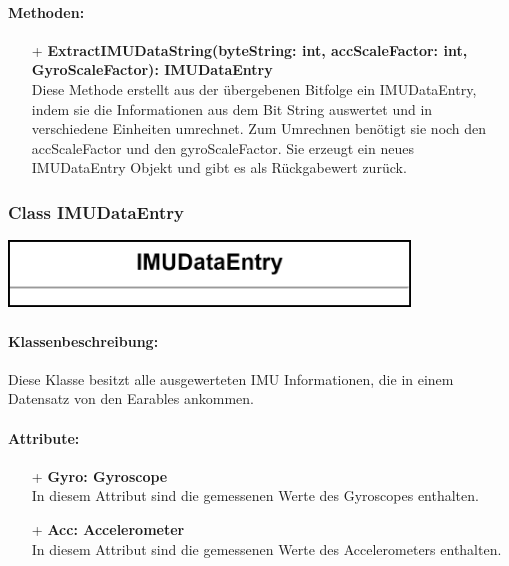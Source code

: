\documentclass[a4paper,12pt]{article}
\begin{document}
\paragraph{Methoden:}
\begin{itemize}
	\item[+] \textbf{ExtractIMUDataString(byteString: int, accScaleFactor: int, GyroScaleFactor): IMUDataEntry}\\Diese Methode erstellt aus der übergebenen Bitfolge ein IMUDataEntry, indem sie die Informationen aus dem Bit String auswertet und in verschiedene Einheiten umrechnet. Zum Umrechnen benötigt sie noch den accScaleFactor und den gyroScaleFactor. Sie erzeugt ein neues IMUDataEntry Objekt und gibt es als Rückgabewert zurück.
\end{itemize}


\begin{minipage}[b]{0.5\textwidth}
	\subsubsection{Class IMUDataEntry}
	
	\end{minipage}
	\begin{minipage}[c]{0.5\textwidth}
	\includegraphics[width=0.8\textwidth]{bilder/BibPackageKlassen/IMUDataEntry.png}
\end{minipage}
\paragraph{Klassenbeschreibung:}
Diese Klasse besitzt alle ausgewerteten IMU Informationen, die in einem Datensatz von den \Gls{Earables} ankommen.

\paragraph{Attribute:}
\begin{itemize}
	\item[+] \textbf{Gyro: Gyroscope}\\In diesem Attribut sind die gemessenen Werte des Gyroscopes enthalten.
	\item[+] \textbf{Acc: Accelerometer}\\In diesem Attribut sind die gemessenen Werte des Accelerometers enthalten.
\end{itemize}
\end{document}

